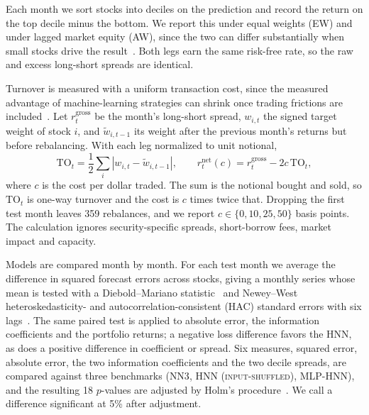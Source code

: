 \documentclass[sigconf,nonacm]{acmart}
\newcommand{\HNNShuffle}{\textsc{HNN (input-shuffled)}}
\newcommand{\MLPHNN}{\textsc{MLP-HNN}}
\newcommand{\NNThree}{\textsc{NN3}}
\begin{document}
Each month we sort stocks into deciles on the prediction and record the return
on the top decile minus the bottom. We report this under equal weights (EW) and
under lagged market equity (AW), since the two can differ substantially when
small stocks drive the result~\cite{famafrench2008}. Both legs earn the same
risk-free rate, so the raw and excess long-short spreads are identical.



Turnover is measured with a uniform transaction cost, since the measured
advantage of machine-learning strategies can shrink once trading frictions are
included~\cite{avramov2023}. Let \(r^{\mathrm{gross}}_t\) be the month's
long-short spread, \(w_{i,t}\) the signed target weight of stock \(i\), and
\(\widetilde w_{i,t-1}\) its weight after the previous month's returns but
before rebalancing. With each leg normalized to unit notional,
\begin{equation}
 \mathrm{TO}_t=\frac{1}{2}\sum_i
 |w_{i,t}-\widetilde w_{i,t-1}|,\qquad
 r^{\mathrm{net}}_t(c)=r^{\mathrm{gross}}_t-2c\,\mathrm{TO}_t ,
 \label{eq:cost}
\end{equation}
where \(c\) is the cost per dollar traded. The sum is the notional bought and
sold, so \(\mathrm{TO}_t\) is one-way turnover and the cost is \(c\) times twice
that. Dropping the first test month leaves 359 rebalances, and we report
\(c\in\{0,10,25,50\}\) basis points. The calculation ignores security-specific
spreads, short-borrow fees, market impact and capacity.

Models are compared month by month. For each test month we average the
difference in squared forecast errors across stocks, giving a monthly series
whose mean is tested with a Diebold--Mariano statistic~\cite{diebold1995} and
Newey--West heteroskedasticity- and autocorrelation-consistent (HAC) standard errors with six lags~\cite{neweywest1987}. The same paired
test is applied to absolute error, the information coefficients and the
portfolio returns; a negative loss difference favors the HNN, as does a positive
difference in coefficient or spread. Six measures, squared error, absolute
error, the two information coefficients and the two decile spreads, are compared
against three benchmarks (\NNThree{}, \HNNShuffle{}, \MLPHNN{}), and the
resulting 18 \(p\)-values are adjusted by Holm's procedure~\cite{holm1979}. We
call a difference significant at 5\% after adjustment.



\end{document}
